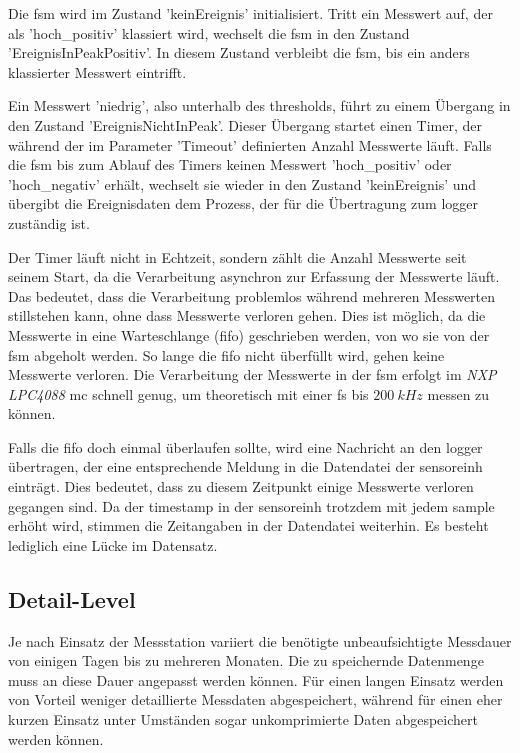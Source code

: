 Die \gls{fsm} wird im Zustand 'keinEreignis' initialisiert. Tritt ein Messwert auf, der als 'hoch\_positiv' klassiert wird, wechselt die \gls{fsm} in den Zustand 'EreignisInPeakPositiv'. In diesem Zustand verbleibt die \gls{fsm}, bis ein anders klassierter Messwert eintrifft. 

Ein Messwert 'niedrig', also unterhalb des \gls{threshold}s, führt zu einem Übergang in den Zustand 'EreignisNichtInPeak'. Dieser Übergang startet einen Timer, der während der im Parameter 'Timeout' definierten Anzahl Messwerte läuft. Falls die \gls{fsm} bis zum Ablauf des Timers keinen Messwert 'hoch\_positiv' oder 'hoch\_negativ' erhält, wechselt sie wieder in den Zustand 'keinEreignis' und übergibt die Ereignisdaten dem Prozess, der für die Übertragung zum \gls{logger} zuständig ist. 

Der Timer läuft nicht in Echtzeit, sondern zählt die Anzahl Messwerte seit seinem Start, da die Verarbeitung asynchron zur Erfassung der Messwerte läuft. Das bedeutet, dass die Verarbeitung problemlos während mehreren Messwerten stillstehen kann, ohne dass Messwerte verloren gehen. Dies ist möglich, da die Messwerte in eine Warteschlange (\gls{fifo}) geschrieben werden, von wo sie von der \gls{fsm} abgeholt werden. So lange die \gls{fifo} nicht überfüllt wird, gehen keine Messwerte verloren. Die Verarbeitung der Messwerte in der \gls{fsm} erfolgt im \emph{NXP LPC4088} \gls{mc} schnell genug, um theoretisch mit einer \gls{fs} bis \ensuremath{200~kHz} messen zu können.

Falls die \gls{fifo} doch einmal überlaufen sollte, wird eine Nachricht an den \gls{logger} übertragen, der eine entsprechende Meldung in die Datendatei der \gls{sensoreinh} einträgt. Dies bedeutet, dass zu diesem Zeitpunkt einige Messwerte verloren gegangen sind. Da der \gls{timestamp} in der \gls{sensoreinh} trotzdem mit jedem \gls{sample} erhöht wird, stimmen die Zeitangaben in der Datendatei weiterhin. Es besteht lediglich eine Lücke im Datensatz.

\subsection{Detail-Level}
Je nach Einsatz der Messstation variiert die benötigte unbeaufsichtigte Messdauer von einigen Tagen bis zu mehreren Monaten. Die zu speichernde Datenmenge muss an diese Dauer angepasst werden können. Für einen langen Einsatz werden von Vorteil weniger detaillierte Messdaten abgespeichert, während für einen eher kurzen Einsatz unter Umständen sogar unkomprimierte Daten abgespeichert werden können.

